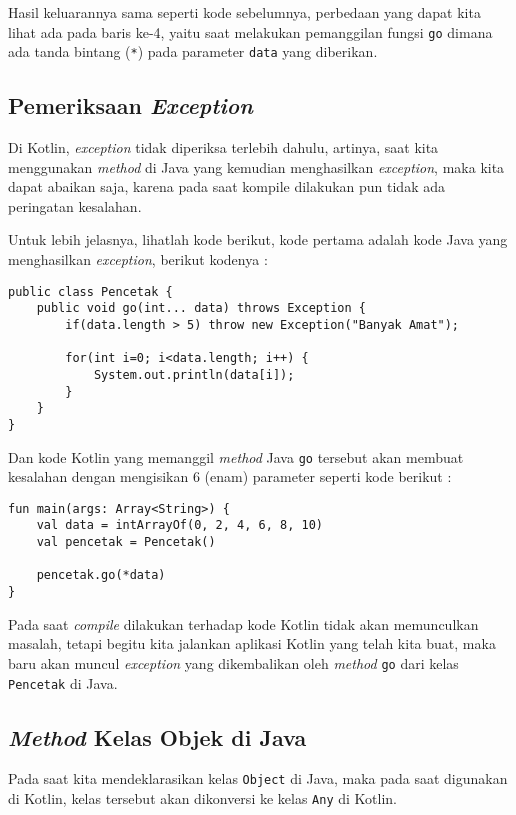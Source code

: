 Hasil keluarannya sama seperti kode sebelumnya, perbedaan yang dapat kita lihat ada pada baris ke-4, yaitu saat melakukan pemanggilan fungsi \texttt{go} dimana ada tanda bintang (\texttt{*}) pada parameter \texttt{data} yang diberikan.

\subsection{Pemeriksaan \textit{Exception}}

Di Kotlin, \textit{exception} tidak diperiksa terlebih dahulu, artinya, saat kita menggunakan \textit{method} di Java yang kemudian menghasilkan \textit{exception}, maka kita dapat abaikan saja, karena pada saat kompile dilakukan pun tidak ada peringatan kesalahan. 

Untuk lebih jelasnya, lihatlah kode berikut, kode pertama adalah kode Java yang menghasilkan \textit{exception}, berikut kodenya :

\begin{lstlisting}
public class Pencetak {
	public void go(int... data) throws Exception {
		if(data.length > 5) throw new Exception("Banyak Amat");
		
		for(int i=0; i<data.length; i++) {
			System.out.println(data[i]);
		}
	}
}
\end{lstlisting}

Dan kode Kotlin yang memanggil \textit{method} Java \texttt{go} tersebut akan membuat kesalahan dengan mengisikan 6 (enam) parameter seperti kode berikut :

\begin{lstlisting}
fun main(args: Array<String>) {
	val data = intArrayOf(0, 2, 4, 6, 8, 10)
	val pencetak = Pencetak()	
	
	pencetak.go(*data)
}
\end{lstlisting}

Pada saat \textit{compile} dilakukan terhadap kode Kotlin tidak akan memunculkan masalah, tetapi begitu kita jalankan aplikasi Kotlin yang telah kita buat, maka baru akan muncul \textit{exception} yang dikembalikan oleh \textit{method} \texttt{go} dari kelas \texttt{Pencetak} di Java.

\subsection{\textit{Method} Kelas Objek di Java}

Pada saat kita mendeklarasikan kelas \texttt{Object} di Java, maka pada saat digunakan di Kotlin, kelas tersebut akan dikonversi ke kelas \texttt{Any} di Kotlin.

